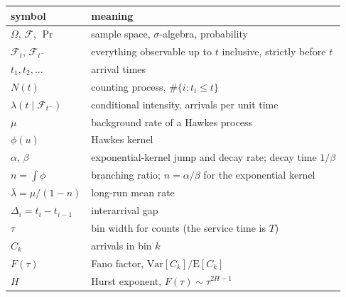 \begin{center}
\begin{tabular}{@{}ll@{}}
\toprule
symbol & meaning \\
\midrule
$\Omega$, $\mathcal{F}$, $\Pr$ & sample space, $\sigma$-algebra, probability \\
$\mathcal{F}_t$, $\mathcal{F}_{t^-}$ & everything observable up to $t$ inclusive, strictly before $t$ \\
$t_1, t_2, \ldots$ & arrival times \\
$N(t)$ & counting process, $\#\{i : t_i \leq t\}$ \\
$\lambda(t \mid \mathcal{F}_{t^-})$ & conditional intensity, arrivals per unit time \\
$\mu$ & background rate of a Hawkes process \\
$\phi(u)$ & Hawkes kernel \\
$\alpha$, $\beta$ & exponential-kernel jump and decay rate; decay time $1/\beta$ \\
$n = \int \phi$ & branching ratio; $n = \alpha/\beta$ for the exponential kernel \\
$\bar\lambda = \mu/(1-n)$ & long-run mean rate \\
$\Delta_i = t_i - t_{i-1}$ & interarrival gap \\
$\tau$ & bin width for counts (the service time is $T$) \\
$C_k$ & arrivals in bin $k$ \\
$F(\tau)$ & Fano factor, $\mathrm{Var}[C_k] / \mathrm{E}[C_k]$ \\
$H$ & Hurst exponent, $F(\tau) \sim \tau^{2H-1}$ \\
\bottomrule
\end{tabular}
\end{center}
